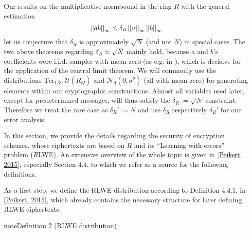 \documentclass[letterpaper,10pt,english]{jupyterBook}
\begin{document}
\sphinxAtStartPar
Our results on the multiplicative norm\sphinxhyphen{}bound in the ring \(R\) with the general estimation
\begin{equation*}
\begin{split}\left\lvert\left\lvert ab \right\rvert\right\rvert_\infty \le \delta_R \left\lvert\left\lvert a \right\rvert\right\rvert_\infty \left\lvert\left\lvert b \right\rvert\right\rvert_\infty\end{split}
\end{equation*}
\sphinxAtStartPar
let us conjecture that \(\delta_R\) is approximately \(\sqrt{N}\) (and not \(N\)) in special cases.
The two above theorems regarding \(\delta_R \approx \sqrt{N}\) mainly hold, because \(a\) and \(b\)’s coefficients were i.i.d. samples with mean zero (as e.g. in {\hyperref[\detokenize{Thesis:uniform-times-ternary}]{}}), which is decisive for the application of the central limit theorem.
We will commonly use the distributions \(\mathrm{Ter}_{1/3}, \mathcal U(R_Q)\) and \(\mathcal N_d(0,\sigma^2)\) (all with mean zero) for generating elements within our cryptographic constructions.
Almost all variables used later, except for predetermined messages, will thus satisfy the \(\delta_R := \sqrt{N}\) constraint.
Therefore we treat the rare case as \(\delta_R' := N\) and use \(\delta_R\) respectively \(\delta_R'\) for our error analysis.

\label{\detokenize{Thesis:security}}
\begin{DUlineblock}{0em}
\item[] 
\end{DUlineblock}

\begin{DUlineblock}{0em}
\item[] 
\end{DUlineblock}

\sphinxAtStartPar
In this section, we provide the details regarding the security of encryption schemes, whose ciphertexts are based on \(R\) and its “Learning with errors” problem (\(R\)\sphinxhyphen{}LWE).
An extensive overview of the whole topic is given in {[}\hyperlink{cite.Thesis:id65}{Peikert, 2015}{]}, especially Section 4.4, to which we refer as a source for the following definitions.

\sphinxAtStartPar
As a first step, we define the RLWE distribution according to Definition 4.4.1. in {[}\hyperlink{cite.Thesis:id65}{Peikert, 2015}{]}, which already contains the necessary structure for later defining RLWE ciphertexts.
\label{Thesis:RLWE-distribution}
\begin{sphinxadmonition}{note}{Definition 2 (RLWE distribution)}
\end{sphinxadmonition}
\end{document}
